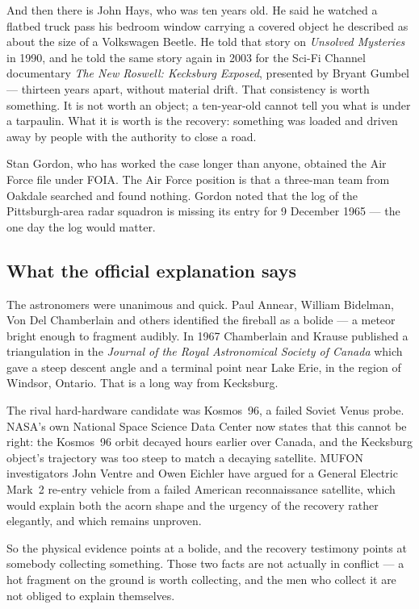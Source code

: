 And then there is John Hays, who was ten years old. He said he watched a flatbed truck pass his
bedroom window carrying a covered object he described as about the size of a Volkswagen Beetle. He
told that story on \emph{Unsolved Mysteries} in 1990, and he told the same story again in 2003 for
the Sci-Fi Channel documentary \emph{The New Roswell: Kecksburg Exposed}, presented by Bryant
Gumbel --- thirteen years apart, without material drift. That consistency is worth something. It is
not worth an object; a ten-year-old cannot tell you what is under a tarpaulin. What it is worth is
the recovery: something was loaded and driven away by people with the authority to close a road.

Stan Gordon, who has worked the case longer than anyone, obtained the Air Force file under FOIA.
The Air Force position is that a three-man team from Oakdale searched and found nothing. Gordon
noted that the log of the Pittsburgh-area radar squadron is missing its entry for 9 December 1965
--- the one day the log would matter.

\subsection*{What the official explanation says}

The astronomers were unanimous and quick. Paul Annear, William Bidelman, Von Del Chamberlain and
others identified the fireball as a bolide --- a meteor bright enough to fragment audibly. In 1967
Chamberlain and Krause published a triangulation in the \emph{Journal of the Royal Astronomical
Society of Canada} which gave a steep descent angle and a terminal point near Lake Erie, in the
region of Windsor, Ontario. That is a long way from Kecksburg.

The rival hard-hardware candidate was Kosmos~96, a failed Soviet Venus probe. NASA's own National
Space Science Data Center now states that this cannot be right: the Kosmos~96 orbit decayed hours
earlier over Canada, and the Kecksburg object's trajectory was too steep to match a decaying
satellite. MUFON investigators John Ventre and Owen Eichler have argued for a General Electric
Mark~2 re-entry vehicle from a failed American reconnaissance satellite, which would explain both
the acorn shape and the urgency of the recovery rather elegantly, and which remains unproven.

So the physical evidence points at a bolide, and the recovery testimony points at somebody
collecting something. Those two facts are not actually in conflict --- a hot fragment on the ground
is worth collecting, and the men who collect it are not obliged to explain themselves.

